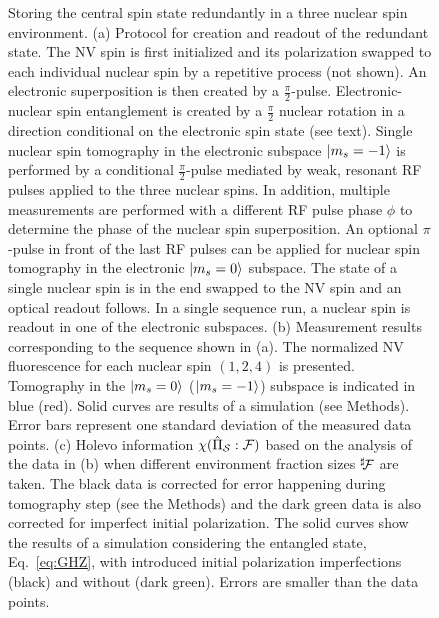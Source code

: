 \documentclass[aps,prl,floatfix,twocolumn,footinbib,superscriptaddress]{revtex4-1}
\begin{document}
\begin{figure}
\centerline{}
\caption{Storing the central spin state redundantly in a three nuclear spin environment. (a) Protocol for creation and readout of the redundant state. The NV spin is first initialized and its polarization swapped to each individual nuclear spin by a repetitive process (not shown). An electronic superposition is then created by a $\frac{\pi}{2}$-pulse. Electronic-nuclear spin entanglement is created by a $\frac{\pi}{2}$ nuclear rotation in a direction conditional on the electronic spin state (see text). Single nuclear spin tomography in the electronic subspace $|m_s=-1\rangle$ is performed by a conditional $\frac{\pi}{2}$-pulse mediated by weak, resonant RF pulses applied to the three nuclear spins. In addition, multiple measurements are performed with a different RF pulse phase $\phi$ to determine the phase of the nuclear spin superposition. An optional $\pi$-pulse in front of the last RF pulses can be applied for nuclear spin tomography in the electronic $|m_s=0\rangle$ subspace. The state of a single nuclear spin is in the end swapped to the NV spin and an optical readout follows. In a single sequence run, a nuclear spin is readout in one of the electronic subspaces. (b) Measurement results corresponding to the sequence shown in (a). The normalized NV fluorescence for each nuclear spin $(1,2,4)$ is presented. Tomography in the $|m_s=0\rangle$ ($|m_s=-1\rangle$) subspace is indicated in blue (red). Solid curves are results of a simulation (see Methods). Error bars represent one standard deviation of the measured data points. (c) Holevo information $\chi ( \hat{\Pi}_{\mathcal{S}}:\mathcal{F} )$ based on the analysis of the data in (b) when different environment fraction sizes ${^{\sharp}}\hspace{-0.7mm}\mathcal{F}$ are taken. The black data is corrected for error happening during tomography step (see the Methods) and the dark green data is also corrected for imperfect initial polarization. The solid curves show the results of a simulation considering the entangled state, Eq.~\eqref{eq:GHZ}, with introduced initial polarization imperfections (black) and without (dark green). Errors are smaller than the data points.} 
\label{fig:3}
\end{figure}
\end{document}
